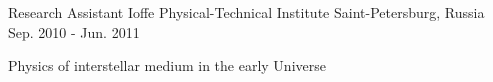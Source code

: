 \begin{cventries}
  \cventry
    {Research Assistant} %
    {Ioffe Physical-Technical Institute} %
    {Saint-Petersburg, Russia} %
    {Sep. 2010 - Jun. 2011} %
    {
      \begin{cvitems} %
        \item {Physics of interstellar medium in the early Universe}
      \end{cvitems}
    }

\end{cventries}
